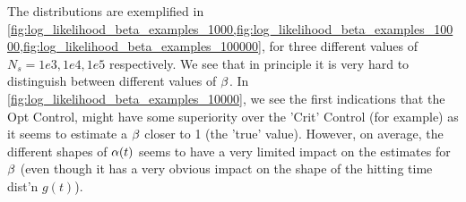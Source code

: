 \documentclass{article}
\begin{document}
The distributions are exemplified in
\cref{fig:log_likelihood_beta_examples_1000,fig:log_likelihood_beta_examples_10000,fig:log_likelihood_beta_examples_100000},
for three different values of $N_s = 1e3, 1e4, 1e5$ respectively. We see that in
principle it is very hard to distinguish between different values of ${\beta}$. In
\cref{fig:log_likelihood_beta_examples_10000}, we see the first indications that
the Opt Control, might have some superiority over the 'Crit' Control (for
example) as it seems to estimate a ${\beta}$ closer to 1 (the 'true' value). However,
on average, the different shapes of ${\alpha}(t)$ seems to have a very limited impact
on the estimates for ${\beta}$ (even though it has a very obvious impact on the shape
of the hitting time dist'n $g(t)$).


\begin{figure}[h]
\begin{center} 
\\   
\end{center}
\end{figure}
\end{document}

